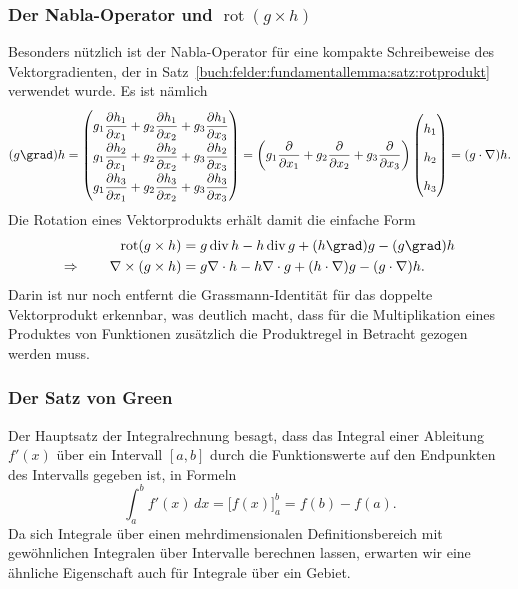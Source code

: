 %
%
%
\subsubsection{Der Nabla-Operator und $\operatorname{rot}(g\times h)$}
Besonders nützlich ist der Nabla-Operator für eine kompakte Schreibeweise
des Vektorgradienten, der in
Satz~\ref{buch:felder:fundamentallemma:satz:rotprodukt}
verwendet wurde.
Es ist nämlich
\[
(g\grad)h
=
{\renewcommand{\arraystretch}{1.9}
\begin{pmatrix}
\displaystyle
g_1\frac{\partial h_1}{\partial x_1}
+
g_2\frac{\partial h_1}{\partial x_2}
+
g_3\frac{\partial h_1}{\partial x_3}
\\
\displaystyle
g_1\frac{\partial h_2}{\partial x_1}
+
g_2\frac{\partial h_2}{\partial x_2}
+
g_3\frac{\partial h_2}{\partial x_3}
\\
\displaystyle
g_1\frac{\partial h_3}{\partial x_1}
+
g_2\frac{\partial h_3}{\partial x_2}
+
g_3\frac{\partial h_3}{\partial x_3}
\end{pmatrix}}
=
\biggl(
g_1\frac{\partial}{\partial x_1}
+
g_2\frac{\partial}{\partial x_2}
+
g_3\frac{\partial}{\partial x_3}
\biggr)
\begin{pmatrix}
h_1\\h_2\\h_3
\end{pmatrix}
=
(g\cdot\nabla) h.
\]
Die Rotation eines Vektorprodukts erhält damit die einfache Form
\begin{align*}
\operatorname{rot}(g\times h)
&=
g\operatorname{div}h
-
h\operatorname{div}g
+
(h\grad)g-(g\grad)h
\\
\Rightarrow
\qquad
\nabla\times(g\times h)
&=
g\nabla\cdot h - h\nabla\cdot g
+
(h\cdot \nabla)g
-
(g\cdot\nabla) h.
\end{align*}
Darin ist nur noch entfernt die Grassmann-Identität für das doppelte
Vektorprodukt erkennbar, was deutlich macht, dass für die Multiplikation
eines Produktes von Funktionen zusätzlich die Produktregel in Betracht
gezogen werden muss.

%
%
\subsubsection{Der Satz von Green}
Der Hauptsatz der Integralrechnung besagt, dass das Integral
einer Ableitung $f'(x)$ über ein Intervall $[a,b]$ durch die
Funktionswerte auf den Endpunkten des Intervalls gegeben ist,
in Formeln
\[
\int_a^b f'(x)\,dx
=
\biggl[f(x)\biggr]_a^b
=
f(b)-f(a).
\]
Da sich Integrale über einen mehrdimensionalen Definitionsbereich
mit gewöhnlichen Integralen über Intervalle berechnen lassen,
erwarten wir eine ähnliche Eigenschaft auch für Integrale über
ein Gebiet.

